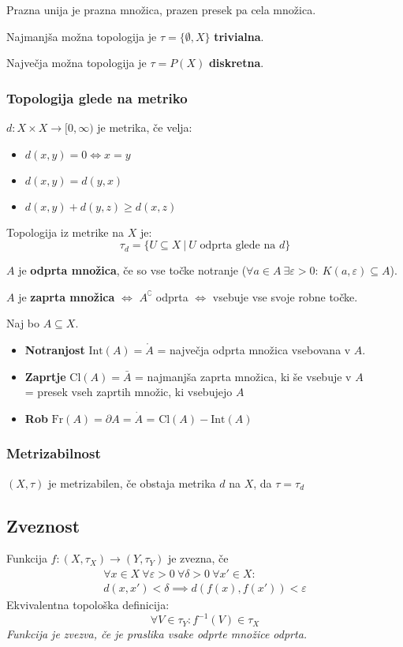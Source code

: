 Prazna unija je prazna množica, prazen presek pa cela množica.

Najmanjša možna topologija je $\tau = \{\emptyset, X\}$ \textbf{trivialna}.

Največja možna topologija je $\tau = P(X)$ \textbf{diskretna}.

\subsubsection*{Topologija glede na metriko}
$d: X \times X \to [0,\infty)$ je metrika, če velja:
\begin{itemize}
	\item $d(x, y) = 0 \iff x = y$
	\item $d(x, y) = d(y, x)$
	\item $d(x, y) + d(y, z) \geq d(x, z)$
\end{itemize}
Topologija iz metrike na $X$ je:
\[ \tau_d = \{ U \subseteq X\ |\ U \text{ odprta glede na } d\}\]

$A$ je \textbf{odprta množica}, če so vse točke notranje ($\forall a \in A\ \exists \varepsilon > 0:\ K(a, \varepsilon) \subseteq A$).

$A$ je \textbf{zaprta množica} $\iff$ $A^{\complement}$ odprta $\iff$ vsebuje vse svoje robne točke. 

Naj bo $A \subseteq X$.
\begin{itemize}
	\item \textbf{Notranjost} $\text{Int}(A) = \mathring{A}$ = največja odprta množica vsebovana v $A$.
	\item \textbf{Zaprtje} $\text{Cl}(A) = \bar{A}$ = najmanjša zaprta množica, ki še vsebuje v $A$ \\
			= presek vseh zaprtih množic, ki vsebujejo $A$
	\item  \textbf{Rob} $\text{Fr}(A) = \partial A = \dot{A}$ = $\text{Cl}(A) - \text{Int}(A)$
\end{itemize}

\subsubsection*{Metrizabilnost}
$(X, \tau)$ je metrizabilen, če obstaja metrika $d$ na $X$, da $\tau = \tau_d$

\subsection*{Zveznost}
Funkcija $f: (X, \tau_X) \to (Y, \tau_Y)$ je zvezna, če
\begin{multline*}
	\forall x \in X\ \forall \varepsilon > 0\ \forall \delta > 0\ \forall x' \in X:\\ d(x,x') < \delta \implies d(f(x),f(x')) < \varepsilon
\end{multline*}
Ekvivalentna topološka definicija:
\[\forall V \in \tau_Y : f^{-1}(V) \in \tau_X\]
\emph{Funkcija je zvezva, če je praslika vsake odprte množice odprta.}


